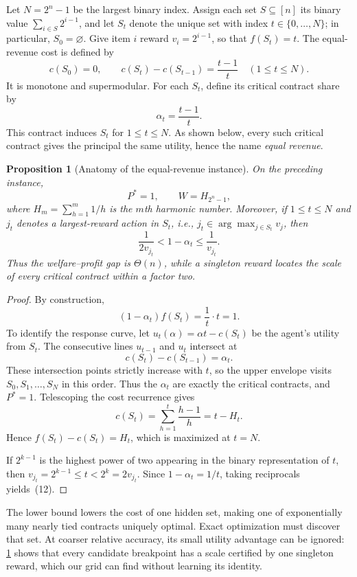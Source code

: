 \documentclass[11pt]{article}
\newtheorem{proposition}[proposition]{Proposition}
\begin{document}
Let $N=2^n-1$ be the largest binary index.  Assign each set $S\subseteq[n]$
its binary value $\sum_{i\in S}2^{i-1}$, and let $S_t$ denote the unique set
with index $t\in\{0,\ldots,N\}$; in particular,
$S_0=\varnothing$.  Give item $i$ reward $v_i=2^{i-1}$, so that
$f(S_t)=t$.  The
equal-revenue cost is defined by
\[
 c(S_0)=0,\qquad
 c(S_t)-c(S_{t-1})=\frac{t-1}{t}
 \quad(1\leq t\leq N).
\]
It is monotone and supermodular.  For each $S_t$, define its critical contract
share by
\[
                        \alpha_t=\frac{t-1}{t}.
\]
This contract induces $S_t$ for $1\leq t\leq N$.  As shown below, every such critical contract gives the
principal the same utility, hence the name \emph{equal revenue}.

\begin{proposition}[Anatomy of the equal-revenue instance]
\label{prop:equal-revenue}
On the preceding instance,
\[
       P^*=1,\qquad
       W=H_{2^n-1},
\]
where $H_m=\sum_{h=1}^m1/h$ is the $m$th harmonic number.  Moreover, if
$1\leq t\leq N$ and $j_t$ denotes a largest-reward action in $S_t$, i.e.,
$j_t\in\arg\max_{j\in S_t}v_j$, then
\[
 \frac{1}{2v_{j_t}}
 < 1-\alpha_t
 \leq\frac{1}{v_{j_t}}.                                 \tag{12}
\]
Thus the welfare--profit gap is $\Theta(n)$, while a singleton reward
locates the scale of every critical contract within a factor two.
\end{proposition}

\begin{proof}
By construction,
\[
 (1-\alpha_t)f(S_t)=\frac1t\cdot t=1.
\]
To identify the response curve, let
$u_t(\alpha)=\alpha t-c(S_t)$ be the agent's utility from $S_t$.
The consecutive lines $u_{t-1}$ and $u_t$ intersect at
\[
 c(S_t)-c(S_{t-1})=\alpha_t.
\]
These intersection points strictly increase with $t$, so the upper envelope
visits $S_0,S_1,\ldots,S_N$ in this order.  Thus the $\alpha_t$ are exactly
the critical contracts, and $P^*=1$.  Telescoping the cost recurrence gives
\[
 c(S_t)=\sum_{h=1}^t\frac{h-1}{h}
       =t-H_t.
\]
Hence $f(S_t)-c(S_t)=H_t$, which is maximized at $t=N$.

If $2^{k-1}$ is the highest power of two appearing in the binary
representation of $t$, then $v_{j_t}=2^{k-1}\leq t<2^k=2v_{j_t}$.
Since $1-\alpha_t=1/t$, taking reciprocals yields~(12).
\end{proof}

The lower bound lowers the cost of one hidden set, making one of exponentially
many nearly tied contracts uniquely optimal.  Exact optimization must discover
that set.  At coarser relative accuracy, its small utility advantage can be
ignored: \cref{prop:equal-revenue} shows that every candidate breakpoint has
a scale certified by one singleton reward, which our grid can find without
learning its identity.
\end{document}
